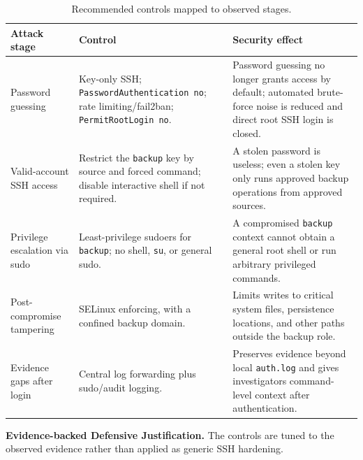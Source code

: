 \documentclass[10pt,a4paper]{article}
\begin{document}
\begin{table}[H]
\centering
\caption{Recommended controls mapped to observed stages.}
\scriptsize
\begin{tabularx}{\linewidth}{L{2.35cm}L{4.65cm}Y}
\toprule
Attack stage & Control & Security effect \\
\midrule
Password guessing & Key-only SSH; \texttt{PasswordAuthentication no}; rate limiting/fail2ban; \texttt{PermitRootLogin no}. & Password guessing no longer grants access by default; automated brute-force noise is reduced and direct root SSH login is closed. \\
Valid-account SSH access & Restrict the \texttt{backup} key by source and forced command; disable interactive shell if not required. & A stolen password is useless; even a stolen key only runs approved backup operations from approved sources. \\
Privilege escalation via sudo & Least-privilege sudoers for \texttt{backup}; no shell, \texttt{su}, or general sudo. & A compromised \texttt{backup} context cannot obtain a general root shell or run arbitrary privileged commands. \\
Post-compromise tampering & SELinux enforcing, with a confined backup domain. & Limits writes to critical system files, persistence locations, and other paths outside the backup role. \\
Evidence gaps after login & Central log forwarding plus sudo/audit logging. & Preserves evidence beyond local \texttt{auth.log} and gives investigators command-level context after authentication. \\
\bottomrule
\end{tabularx}
\end{table}

\textbf{Evidence-backed Defensive Justification.} The controls are tuned to the observed evidence rather than applied as generic SSH hardening.
\end{document}
